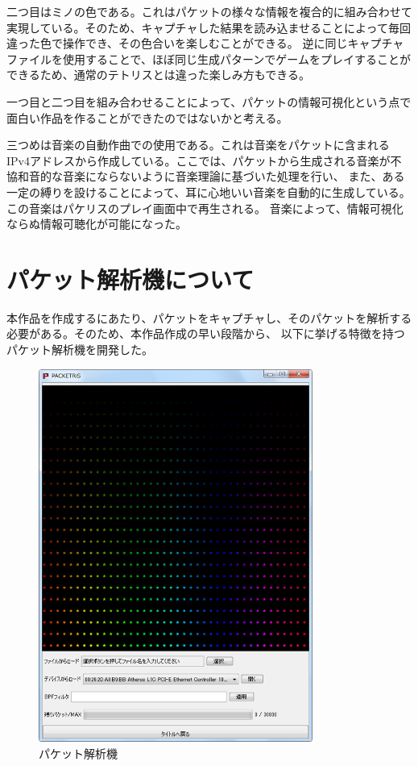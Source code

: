 \documentclass[11pt,a4paper]{jsarticle}
\begin{document}
二つ目はミノの色である。これはパケットの様々な情報を複合的に組み合わせて実現している。そのため、キャプチャした結果を読み込ませることによって毎回違った色で操作でき、その色合いを楽しむことができる。
逆に同じキャプチャファイルを使用することで、ほぼ同じ生成パターンでゲームをプレイすることができるため、通常のテトリスとは違った楽しみ方もできる。

一つ目と二つ目を組み合わせることによって、パケットの情報可視化という点で面白い作品を作ることができたのではないかと考える。

三つめは音楽の自動作曲での使用である。これは音楽をパケットに含まれるIPv4アドレスから作成している。ここでは、パケットから生成される音楽が不協和音的な音楽にならないように音楽理論に基づいた処理を行い、
また、ある一定の縛りを設けることによって、耳に心地いい音楽を自動的に生成している。
この音楽はパケリスのプレイ画面中で再生される。
音楽によって、情報可視化ならぬ情報可聴化が可能になった。

\section{パケット解析機について}
本作品を作成するにあたり、パケットをキャプチャし、そのパケットを解析する必要がある。そのため、本作品作成の早い段階から、
以下に挙げる特徴を持つパケット解析機を開発した。

\begin{figure}[htbp]
\centering
\includegraphics[width=9cm]{packetanalyze.png}
\caption{パケット解析機}
\end{figure}
\end{document}
